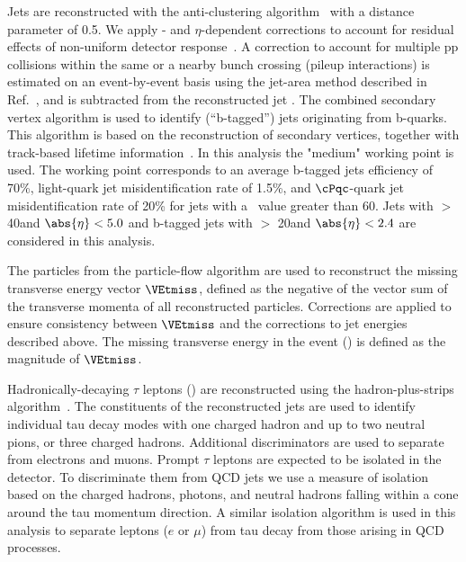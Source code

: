Jets are reconstructed with the anti-\kt clustering
algorithm~\cite{Cacciari:2008gp} with a distance parameter of 0.5. We apply
\pt- and $\eta$-dependent corrections to account for residual
effects of non-uniform detector response~\cite{Chatrchyan:2011ds}.
A correction to account for multiple pp collisions within the same or a nearby
bunch crossing (pileup interactions) is estimated on an event-by-event basis using the
jet-area method described in Ref.~\cite{Cacciari:2007fd}, and is
subtracted from the reconstructed jet \pt.
The combined secondary vertex algorithm is used to identify (``b-tagged'') jets 
originating from b-quarks.  This algorithm 
 is based on the reconstruction of secondary vertices, together with track-based lifetime information~\cite{Chatrchyan:2012jua}. 
In this analysis the "medium" working point is used. The working point corresponds to an average b-tagged jets efficiency of 70\%, 
light-quark jet misidentification rate of 1.5\%, and $\cPqc$-quark jet misidentification rate of 20\% 
for jets with a \pt\ value greater than 60\GeV.
Jets with  \PT $>$ 40\GeV and $\abs{\eta} < 5.0$ and b-tagged jets with \PT $>$ 20\GeV and $\abs{\eta} < 2.4$ are considered in this analysis.


The particles from the particle-flow algorithm are used to reconstruct the missing transverse energy vector $\VEtmiss$, defined as the negative of the vector sum of the transverse momenta of all reconstructed particles.  Corrections are applied to ensure consistency between
$\VEtmiss$ and the corrections to jet energies described above.  The missing transverse energy in the event (\MPT) is defined as the magnitude of $\VEtmiss$.



Hadronically-decaying $\tau$ leptons (\Tau) are reconstructed using the hadron-plus-strips algorithm~\cite{Khachatryan:2015dfa}. The constituents of the reconstructed jets are used to identify individual tau decay modes with one charged hadron and up to two neutral pions, or three charged hadrons. 
Additional discriminators are used to separate \Tau from electrons and muons.
Prompt $\tau$ leptons are expected to be isolated in the detector.
To discriminate them from QCD jets we use a measure of isolation 
based on the charged hadrons, photons, and neutral hadrons falling within 
a cone around the tau momentum direction.  A similar isolation algorithm is 
used in this analysis to separate leptons ($e$ or $\mu$) from tau decay from 
those arising in QCD processes.

